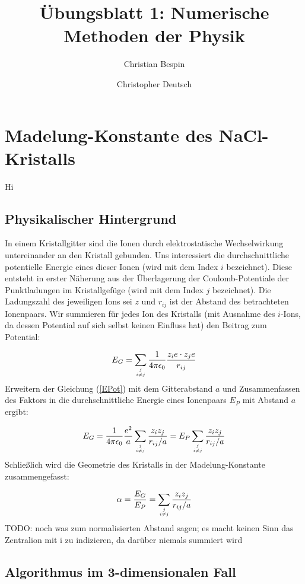 \documentclass[10pt,a4paper]{article}
\author{Christian Bespin \and Christopher Deutsch}
\title{Übungsblatt 1: Numerische Methoden der Physik}
\begin{document}
\maketitle

\section{Madelung-Konstante des NaCl-Kristalls}
Hi
\subsection{Physikalischer Hintergrund}
In einem Kristallgitter sind die Ionen durch elektrostatische Wechselwirkung untereinander an den Kristall gebunden.
Uns interessiert die durchschnittliche potentielle Energie eines dieser Ionen (wird mit dem Index $i$ bezeichnet).
Diese entsteht in erster Näherung aus der Überlagerung der Coulomb-Potentiale der Punktladungen im Kristallgefüge
(wird mit dem Index $j$ bezeichnet). Die Ladungszahl des jeweiligen Ions sei $z$ und $r_{ij}$ ist der Abstand des
betrachteten Ionenpaars. Wir summieren für jedes Ion des Kristalls (mit Ausnahme des $i$-Ions, da dessen Potential
auf sich selbst keinen Einfluss hat) den Beitrag zum Potential:

\begin{align}
\label{EPot}
E_G = \sum_{j\atop i \neq j} \frac{1}{4 \pi \epsilon_0}  \frac{z_i e \cdot z_j e}{r_{ij}}
\end{align}
Erweitern der Gleichung (\ref{EPot}) mit dem Gitterabstand $a$ und Zusammenfassen des Faktors in die durchschnittliche
Energie eines Ionenpaars $E_P$ mit Abstand $a$ ergibt:

\begin{align}
E_G = \frac{1}{4 \pi \epsilon_0} \frac{e^2}{a} \sum_{j\atop i \neq j} \frac{z_i z_j}{r_{ij}/a} = E_P \sum_{j\atop i \neq j} \frac{z_i z_j}{r_{ij}/a}
\end{align}
Schließlich wird die Geometrie des Kristalls in der Madelung-Konstante zusammengefasst:

\begin{align}
\alpha = \frac{E_G}{E_P} = \sum_{j\atop i \neq j} \frac{z_i z_j}{r_{ij}/a}
\end{align}
TODO: noch was zum normalisierten Abstand sagen; es macht keinen Sinn das Zentralion mit i zu indizieren, da darüber niemals summiert wird

\subsection{Algorithmus im 3-dimensionalen Fall}
\end{document}
